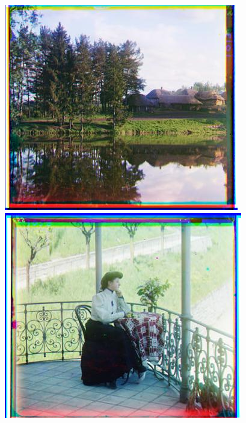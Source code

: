 \documentclass[12pt]{article}
\begin{document}
\begin{center}
\includegraphics[scale=0.6]{processed/processed-64-00163v.jpg}~
\includegraphics[scale=0.6]{processed/processed-64-00194v.jpg}
\end{center}
\end{document}
